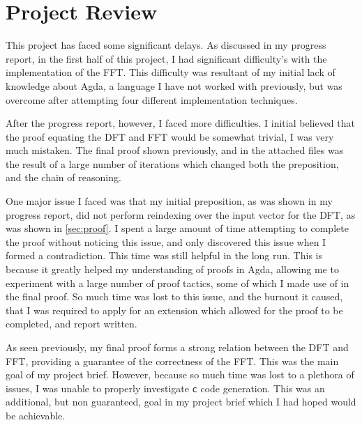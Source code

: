 \section{Project Review}
This project has faced some significant delays.
As discussed in my progress report, in the first half of this project, I had 
significant difficulty's with the implementation of the FFT.
This difficulty was resultant of my initial lack of knowledge about Agda,
a language I have not worked with previously, but was overcome after attempting
four different implementation techniques.

After the progress report, however, I faced more difficulties.
I initial believed that the proof equating the DFT and FFT would
be somewhat trivial, I was very much mistaken.
The final proof shown previously, and in the attached files was the result of a 
large number of iterations which changed both the preposition, and the chain of
reasoning.

One major issue I faced was that my initial preposition, as was shown in my 
progress report, did not perform reindexing over the input vector for the DFT, 
as was shown in \ref{sec:proof}.
I spent a large amount of time attempting to complete the proof without noticing
this issue, and only discovered this issue when I formed a contradiction.
This time was still helpful in the long run.
This is because it greatly helped my understanding of proofs in Agda, 
allowing me to experiment with a large number of proof tactics, some of which
I made use of in the final proof.
So much time was lost to this issue, and the burnout it caused, that
I was required to apply for an extension which allowed for the proof to be
completed, and report written.

As seen previously, my final proof forms a strong relation between the DFT
and FFT, providing a guarantee of the correctness of the FFT.
This was the main goal of my project brief.
However, because so much time was lost to a plethora of issues, I was unable to 
properly investigate \verb|c| code generation.
This was an additional, but non guaranteed, goal in my project brief which I 
had hoped would be achievable.

